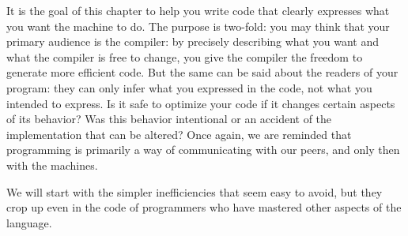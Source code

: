 It is the goal of this chapter to help you write code that clearly expresses what you want the machine to do. The purpose is two-fold: you may think that your primary audience is the compiler: by precisely describing what you want and what the compiler is free to change, you give the compiler the freedom to generate more efficient code. But the same can be said about the readers of your program: they can only infer what you expressed in the code, not what you intended to express. Is it safe to optimize your code if it changes certain aspects of its behavior? Was this behavior intentional or an accident of the implementation that can be altered? Once again, we are reminded that programming is primarily a way of communicating with our peers, and only then with the machines.

We will start with the simpler inefficiencies that seem easy to avoid, but they
crop up even in the code of programmers who have mastered other aspects of the language.














